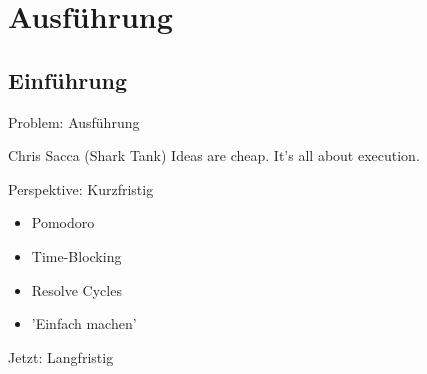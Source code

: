\section{Ausführung}

\subsection{Einführung}


\begin{frame}[c]{Problem: Ausführung}
    \Large
    \begin{aquote}{Chris Sacca (Shark Tank)}
        Ideas are cheap. It's all about execution.
    \end{aquote}
\end{frame}


\begin{frame}[c]{Perspektive: Kurzfristig}
    \Large
    \begin{itemize}
        \item Pomodoro
        \item Time-Blocking
        \item Resolve Cycles
        \item 'Einfach machen'
    \end{itemize}
\end{frame}


\addtocounter{framenumber}{1}
\begin{frame}[standout]
    \Large
    Jetzt: Langfristig
\end{frame}

%
%
%
%
%


